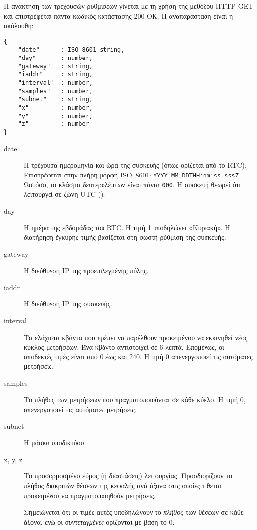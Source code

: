 Η ανάκτηση των τρεχουσών ρυθμίσεων γίνεται με τη χρήση της μεθόδου HTTP GET και
επιστρέφεται πάντα κωδικός κατάστασης 200 OK. Η αναπαράσταση είναι η ακόλουθη:
\begin{lstlisting}
{
    "date"      : ISO 8601 string,
    "day"       : number,
    "gateway"   : string,
    "iaddr"     : string,
    "interval"  : number,
    "samples"   : number,
    "subnet"    : string,
    "x"         : number,
    "y"         : number,
    "z"         : number
}
\end{lstlisting}
\begin{description}
    \item[date] Η τρέχουσα ημερομηνία και ώρα της συσκευής (όπως ορίζεται από το
    RTC). Επιστρέφεται στην πλήρη μορφή ISO~8601:
    \verb~YYYY-MM-DDTHH:mm:ss.sssZ~. Ωστόσο, το κλάσμα δευτερολέπτων είναι πάντα
    \verb~000~. Η συσκευή θεωρεί ότι λειτουργεί σε ζώνη UTC ().

    \item[day] Η ημέρα της εβδομάδας του RTC. Η τιμή 1 υποδηλώνει «Κυριακή». Η
    διατήρηση έγκυρης τιμής βασίζεται στη σωστή ρύθμιση της συσκευής.

    \item[gateway] Η διεύθυνση IP της προεπιλεγμένης πύλης.

    \item[iaddr] Η διεύθυνση IP της συσκευής.

    \item[interval] Τα ελάχιστα κβάντα που πρέπει να παρέλθουν προκειμένου να
    εκκινηθεί νέος κύκλος μετρήσεων. Ένα κβάντο αντιστοιχεί σε 6 λεπτά.
    Επομένως, οι αποδεκτές τιμές είναι από 0 έως και 240. Η τιμή 0 απενεργοποιεί
    τις αυτόματες μετρήσεις.

    \item[samples] Το πλήθος των μετρήσεων που πραγματοποιούνται σε κάθε κύκλο.
    Η τιμή 0, απενεργοποιεί τις αυτόματες μετρήσεις.

    \item[subnet] Η μάσκα υποδικτύου.

    \item[x, y, z] Το προσαρμοσμένο εύρος (ή διαστάσεις) λειτουργίας.
    Προσδιορίζουν το πλήθος διακριτών θέσεων της κεφαλής ανά άξονα στις οποίες
    τίθεται προκειμένου να πραγματοποιηθούν μετρήσεις.

    Σημειώνεται ότι οι τιμές αυτές υποδηλώνουν το \emph{πλήθος} των θέσεων σε
    κάθε άξονα, ενώ οι \emph{συντεταγμένες} ορίζονται με βάση το 0.
\end{description}


